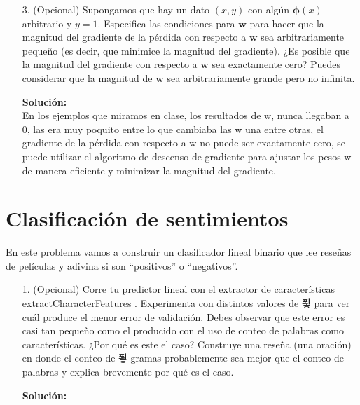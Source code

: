 \documentclass[11pt,letterpaper]{article}
\newenvironment{solution}{%
  \noindent\begin{shaded}
  \textbf{Solución:}\ }{
  \end{shaded}%
}
\begin{document}
\begin{enumerate}
\begin{solution}
\[
\nabla_{\mathbf{w}} \text{Loss}(x, y, \mathbf{w}) = 2(y - p) \sigma(z)(1 - \sigma(z)) \cdot \boldsymbol{\phi}(x)
\]
Al final queda que:
\[
\nabla_{\mathbf{w}} \text{Loss}(x, y, \mathbf{w}) = 2(y - p) \cdot p \cdot (1 - p)\cdot \boldsymbol{\phi}(x)
\]



  \end{solution}

  \item[3.]
(Opcional) Supongamos que hay un dato $(x, y)$ con algún $\boldsymbol{\phi}(x)$ arbitrario y $y = 1$. Especifica las condiciones para $\mathbf{w}$ para hacer que la magnitud del gradiente de la pérdida con respecto a $\mathbf{w}$ sea arbitrariamente pequeño (es decir, que minimice la magnitud del gradiente). ¿Es posible que la magnitud del gradiente con respecto a $\mathbf{w}$ sea exactamente cero? Puedes considerar que la magnitud de $\mathbf{w}$ sea arbitrariamente grande pero no infinita.

  \begin{solution}
\\En los ejemplos que miramos en clase, los resultados de w, nunca llegaban a 0, las era muy poquito entre lo que cambiaba las w una entre otras, el gradiente de la pérdida con respecto a w no puede ser exactamente cero, se puede utilizar el algoritmo de descenso de gradiente para ajustar los pesos w de manera eficiente y minimizar la magnitud del gradiente.


  \end{solution}
\end{enumerate}



\section*{Clasificación de sentimientos}



  En este problema vamos a construir un clasificador lineal binario que lee reseñas de películas y
adivina si son “positivos” o “negativos”.
  
\begin{enumerate}
\item[1.]%
  (Opcional) Corre tu predictor lineal con el extractor de características extractCharacterFeatures .
    Experimenta con distintos valores de 푛 para ver cuál produce el menor error de validación.
    Debes observar que este error es casi tan pequeño como el producido con el uso de conteo
    de palabras como características. ¿Por qué es este el caso?
    Construye una reseña (una oración) en donde el conteo de 푛-gramas probablemente sea
    mejor que el conteo de palabras y explica brevemente por qué es el caso.
  \begin{solution}
 
  \end{solution}

\end{enumerate}
\end{document}
